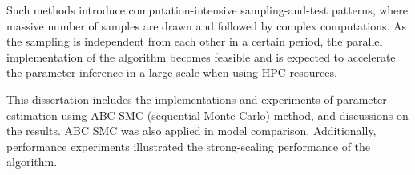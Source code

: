 Such methods introduce computation-intensive sampling-and-test patterns, where massive number of samples are drawn and followed by complex computations. As the sampling is independent from each other in a certain period, the parallel implementation of the algorithm becomes feasible and is expected to accelerate the parameter inference in a large scale when using HPC resources.

This dissertation includes the implementations and experiments of parameter estimation using ABC SMC (sequential Monte-Carlo) method, and discussions on the results. ABC SMC was also applied in model comparison. Additionally, performance experiments illustrated the strong-scaling performance of the algorithm.

